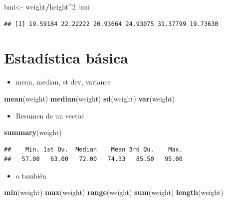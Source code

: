 \documentclass[]{book}
\newenvironment{Shaded}{\begin{snugshade}}{\end{snugshade}}
\newcommand{\KeywordTok}[1]{\textcolor[rgb]{0.13,0.29,0.53}{\textbf{#1}}}
\newcommand{\DecValTok}[1]{\textcolor[rgb]{0.00,0.00,0.81}{#1}}
\newcommand{\StringTok}[1]{\textcolor[rgb]{0.31,0.60,0.02}{#1}}
\newcommand{\OperatorTok}[1]{\textcolor[rgb]{0.81,0.36,0.00}{\textbf{#1}}}
\newcommand{\NormalTok}[1]{#1}
\providecommand{\tightlist}{%
  \setlength{\itemsep}{0pt}\setlength{\parskip}{0pt}}
\begin{document}
\begin{Shaded}
\begin{Highlighting}[]
\NormalTok{bmi<-}\StringTok{ }\NormalTok{weight}\OperatorTok{/}\NormalTok{height}\OperatorTok{^}\DecValTok{2}
\NormalTok{bmi}
\end{Highlighting}
\end{Shaded}

\begin{verbatim}
## [1] 19.59184 22.22222 20.93664 24.93075 31.37799 19.73630
\end{verbatim}

\section{Estadística básica}\label{estadistica-basica}

\begin{itemize}
\tightlist
\item
  mean, median, st dev, variance
\end{itemize}

\begin{Shaded}
\begin{Highlighting}[]
\KeywordTok{mean}\NormalTok{(weight) }
\KeywordTok{median}\NormalTok{(weight)}
\KeywordTok{sd}\NormalTok{(weight)}
\KeywordTok{var}\NormalTok{(weight)}
\end{Highlighting}
\end{Shaded}

\begin{itemize}
\tightlist
\item
  Resumen de un vector
\end{itemize}

\begin{Shaded}
\begin{Highlighting}[]
\KeywordTok{summary}\NormalTok{(weight)}
\end{Highlighting}
\end{Shaded}

\begin{verbatim}
##    Min. 1st Qu.  Median    Mean 3rd Qu.    Max. 
##   57.00   63.00   72.00   74.33   85.50   95.00
\end{verbatim}

\begin{itemize}
\tightlist
\item
  o también
\end{itemize}

\begin{Shaded}
\begin{Highlighting}[]
\KeywordTok{min}\NormalTok{(weight)}
\KeywordTok{max}\NormalTok{(weight)}
\KeywordTok{range}\NormalTok{(weight)}
\KeywordTok{sum}\NormalTok{(weight)}
\KeywordTok{length}\NormalTok{(weight)}
\end{Highlighting}
\end{Shaded}
\end{document}
